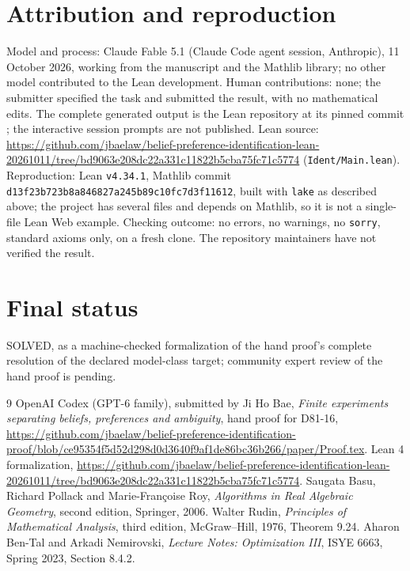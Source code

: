 \documentclass[11pt]{article}
\begin{document}
\section*{Attribution and reproduction}
Model and process: Claude Fable 5.1 (Claude Code agent session, Anthropic), 11 October 2026, working from the manuscript \cite{Hand} and the Mathlib library; no other model contributed to the Lean development. Human contributions: none; the submitter specified the task and submitted the result, with no mathematical edits. The complete generated output is the Lean repository at its pinned commit \cite{Lean}; the interactive session prompts are not published. Lean source: \url{https://github.com/jbaelaw/belief-preference-identification-lean-20261011/tree/bd9063e208dc22a331c11822b5cba75fc71c5774} (\texttt{Ident/Main.lean}). Reproduction: Lean \texttt{v4.34.1}, Mathlib commit \texttt{d13f23b723b8a846827a245b89c10fc7d3f11612}, built with \texttt{lake} as described above; the project has several files and depends on Mathlib, so it is not a single-file Lean Web example. Checking outcome: no errors, no warnings, no \texttt{sorry}, standard axioms only, on a fresh clone. The repository maintainers have not verified the result.

\section*{Final status}
SOLVED, as a machine-checked formalization of the hand proof's complete resolution of the declared model-class target; community expert review of the hand proof is pending.

\begin{thebibliography}{9}
 OpenAI Codex (GPT-6 family), submitted by Ji Ho Bae, \emph{Finite experiments separating beliefs, preferences and ambiguity}, hand proof for D81-16, \url{https://github.com/jbaelaw/belief-preference-identification-proof/blob/ce95354f5d52d298d0d3640f9af1de86bc36b266/paper/Proof.tex}.
 Lean 4 formalization, \url{https://github.com/jbaelaw/belief-preference-identification-lean-20261011/tree/bd9063e208dc22a331c11822b5cba75fc71c5774}.
 Saugata Basu, Richard Pollack and Marie-Fran\c{c}oise Roy, \emph{Algorithms in Real Algebraic Geometry}, second edition, Springer, 2006.
 Walter Rudin, \emph{Principles of Mathematical Analysis}, third edition, McGraw--Hill, 1976, Theorem 9.24.
 Aharon Ben-Tal and Arkadi Nemirovski, \emph{Lecture Notes: Optimization III}, ISYE 6663, Spring 2023, Section 8.4.2.
\end{thebibliography}
\end{document}
